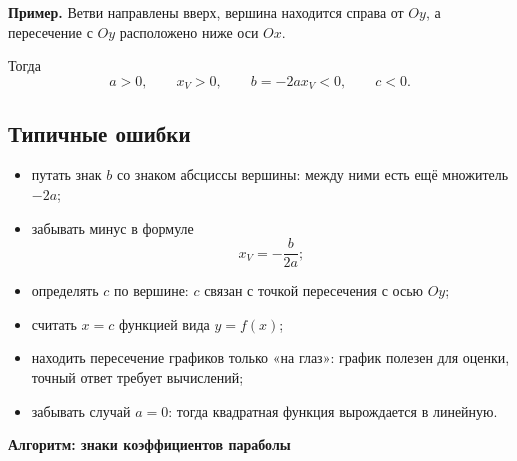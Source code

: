 \documentclass[a4paper,12pt]{article}
\begin{document}
\textbf{Пример.}
Ветви направлены вверх, вершина находится справа от $Oy$,
а пересечение с $Oy$ расположено ниже оси $Ox$.

Тогда
\[
a>0,
\qquad
x_V>0,
\qquad
b=-2ax_V<0,
\qquad
c<0.
\]

\subsection*{Типичные ошибки}

\begin{itemize}
  \item путать знак $b$ со знаком абсциссы вершины: между ними есть ещё множитель $-2a$;

  \item забывать минус в формуле
  \[
  x_V=-\frac{b}{2a};
  \]

  \item определять $c$ по вершине: $c$ связан с точкой пересечения с осью $Oy$;

  \item считать $x=c$ функцией вида $y=f(x)$;

  \item находить пересечение графиков только «на глаз»: график полезен для оценки, точный ответ требует вычислений;

  \item забывать случай $a=0$: тогда квадратная функция вырождается в линейную.
\end{itemize}


\clearpage
\thispagestyle{fancy}

\begin{center}
{\Large\textcolor{darkaccent}{\textbf{Алгоритм: знаки коэффициентов параболы}}}
\end{center}

\vspace{9mm}
\end{document}
